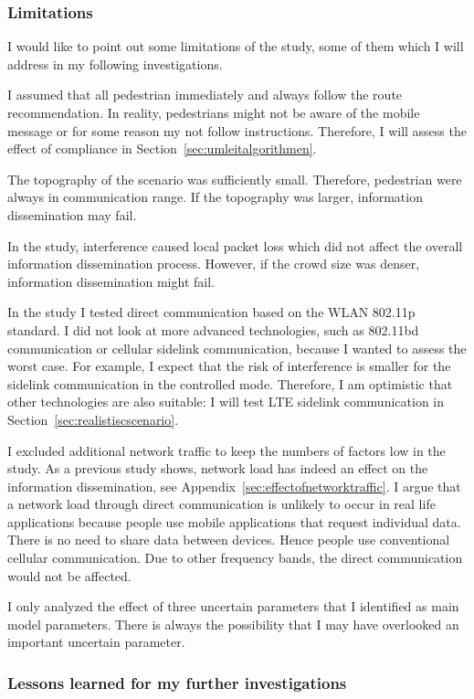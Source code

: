 \subsubsection{Limitations}
I would like to point out some limitations of the study, some of them which I will address in my following investigations.


I assumed that all pedestrian immediately and always follow the route recommendation. In reality, pedestrians might not be aware of the mobile message or for some reason my not follow instructions. Therefore, I will assess the effect of compliance in Section~\ref{sec:umleitalgorithmen}.

The topography of the scenario was sufficiently small. Therefore, pedestrian were always in communication range. If the topography was larger, information dissemination may fail.

In the study, interference caused local packet loss which did not affect the overall information dissemination process. However, if the crowd size was denser, information dissemination might fail. 

In the study I tested direct communication based on the WLAN 802.11p standard. I did not look at more advanced technologies, such as 802.11bd communication or cellular sidelink communication, because I wanted to assess the worst case. For example, I expect that the risk of interference is smaller for the sidelink communication in the controlled mode. Therefore, I am optimistic that other technologies are also suitable: I will test LTE sidelink communication in Section~\ref{sec:realistiscscenario}.

I excluded additional network traffic to keep the numbers of factors low in the study. As a previous study shows, network load has indeed an effect on the information dissemination, see Appendix~\ref{sec:effectofnetworktraffic}. I argue that a network load through direct communication is unlikely to occur in real life applications because people use mobile applications that request individual data. There is no need to share data between devices. Hence people use conventional cellular communication. Due to other frequency bands, the direct communication would not be affected.

I only analyzed the effect of three uncertain parameters that I identified as main model parameters. There is always the possibility that I may have overlooked an important uncertain parameter. 



\subsubsection{Lessons learned for my further investigations}



